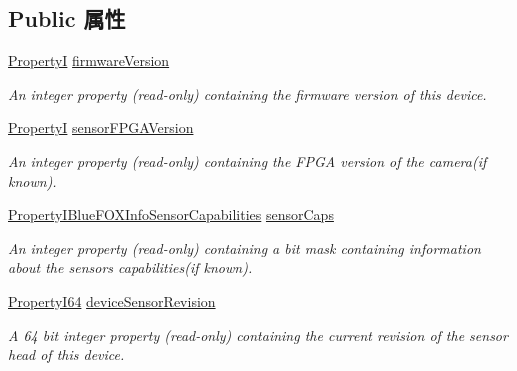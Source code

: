 \subsection*{Public 属性}
\begin{DoxyCompactItemize}
\item 
\hypertarget{classmv_i_m_p_a_c_t_1_1acquire_1_1_info_blue_f_o_x_acc3b699f351fc92e7a2ab7de8aaf91a7}{\hyperlink{group___common_interface_ga12d5e434238ca242a1ba4c6c3ea45780}{Property\+I} \hyperlink{classmv_i_m_p_a_c_t_1_1acquire_1_1_info_blue_f_o_x_acc3b699f351fc92e7a2ab7de8aaf91a7}{firmware\+Version}}\label{classmv_i_m_p_a_c_t_1_1acquire_1_1_info_blue_f_o_x_acc3b699f351fc92e7a2ab7de8aaf91a7}

\begin{DoxyCompactList}\small\item\em An integer property {\bfseries }(read-\/only) containing the firmware version of this device. \end{DoxyCompactList}\item 
\hyperlink{group___common_interface_ga12d5e434238ca242a1ba4c6c3ea45780}{Property\+I} \hyperlink{classmv_i_m_p_a_c_t_1_1acquire_1_1_info_blue_f_o_x_a571b20bb38f76c76728e0784b23e78a4}{sensor\+F\+P\+G\+A\+Version}
\begin{DoxyCompactList}\small\item\em An integer property {\bfseries }(read-\/only) containing the F\+P\+G\+A version of the camera(if known). \end{DoxyCompactList}\item 
\hyperlink{group___device_specific_interface_gafffac026d1345f9026199ff9e237f8ad}{Property\+I\+Blue\+F\+O\+X\+Info\+Sensor\+Capabilities} \hyperlink{classmv_i_m_p_a_c_t_1_1acquire_1_1_info_blue_f_o_x_af1b01c915e47ab797ce087f6a2eec2c9}{sensor\+Caps}
\begin{DoxyCompactList}\small\item\em An integer property {\bfseries }(read-\/only) containing a bit mask containing information about the sensors capabilities(if known). \end{DoxyCompactList}\item 
\hyperlink{group___common_interface_ga81749b2696755513663492664a18a893}{Property\+I64} \hyperlink{classmv_i_m_p_a_c_t_1_1acquire_1_1_info_blue_f_o_x_a1d0d0c36611aa0358b055c95ca70a3f9}{device\+Sensor\+Revision}
\begin{DoxyCompactList}\small\item\em A 64 bit integer property {\bfseries }(read-\/only) containing the current revision of the sensor head of this device. \end{DoxyCompactList}\item 

\end{DoxyCompactItemize}
